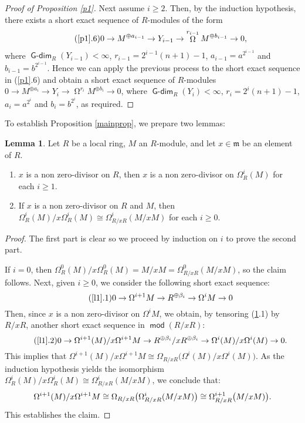 \documentclass{amsart}
\theoremstyle{plain} %
\theoremstyle{definition}
\newtheorem{lem}[thm]{Lemma}
\newcommand{\iso}{\cong}
\newcommand{\m}{\mathfrak{m}}
\def\md{\operatorname{\mathsf{mod}}}
\DeclareMathOperator{\Gdim}{\mathsf{G-dim}}
\DeclareMathOperator{\syz}{\Omega}
\begin{document}
\begin{proof} [Proof of Proposition \ref{p1}]
Next assume $i\geq 2$. Then, by the induction hypothesis, there exists a short exact sequence of $R$-modules of the form
\begin{align} \tag{\ref{p1}.6}
0\to M^{\oplus a_{i-1}} \to Y_{i-1} \to \syz^{r_{i-1}} M^{\oplus b_{i-1}} \to 0,
\end{align}
where $\Gdim_R(Y_{i-1})<\infty$, $r_{i-1}=2^{i-1}(n+1)-1$, $a_{i-1}=a^{2^{i-1}}$ and $b_{i-1}=b^{2^{i-1}}$. Hence we can apply the previous process to the short exact sequence in (\ref{p1}.6) and obtain a short exact sequence of $R$-modules $0\to M^{\oplus a_i} \to Y_i \to \syz^{r_i} M^{\oplus b_i} \to 0$, where $\Gdim_R(Y_i)<\infty$, $r_i=2^i(n+1)-1$, $a_i=a^{2^{i}}$ and $b_i=b^{2^{i}}$, as required.
\end{proof}


To establish Proposition \ref{mainprop}, we prepare two lemmas:

\begin{lem} \label{l1} Let $R$ be a local ring, $M$ an $R$-module, and let $x \in \m$ be an element of $R$.
\begin{enumerate}[\rm(i)]
\item $x$ is a non zero-divisor on $R$, then $x$ is a non zero-divisor on $\Omega_R^i(M)$ for each $i \geq 1$.
\item If $x$ is a non zero-divisor on $R$ and $M$, then $\Omega_R^i(M)/x\Omega_R^i(M) \iso \Omega_{R/xR}^i(M/xM)$ for each $i\geq 0$.
\end{enumerate}
\end{lem}

\begin{proof} The first part is clear so we proceed by induction on $i$ to prove the second part.

If $i=0$, then $\Omega_R^0(M)/x\Omega_R^0(M)=M/xM=\Omega_{R/xR}^0(M/xM)$, so the claim follows. Next, given $i\geq 0$, we consider the following short exact sequence:
\begin{equation}\tag{\ref{l1}.1}
0 \rightarrow \Omega^{i+1} M \rightarrow R^{\oplus \beta_i} \rightarrow \Omega^iM \rightarrow 0
\end{equation}
Then, since $x$ is a non zero-divisor on $\Omega^iM$, we obtain, by tensoring (\ref{l1}.1) by $R/xR$, another short exact sequence in $\md(R/xR)$:
\begin{equation}\tag{\ref{l1}.2}
0 \rightarrow \Omega^{i+1}(M)/x\Omega^{i+1}M  \rightarrow R^{\oplus \beta_i}/xR^{\oplus \beta_i} \rightarrow \Omega^i(M)/x\Omega^i(M) \rightarrow 0.
\end{equation}
This implies that $\Omega^{i+1}(M)/x\Omega^{i+1}M \cong \Omega_{R/xR}\big(\Omega^i(M)/x\Omega^i(M)\big)$. As the induction hypothesis yields the isomorphism $\Omega_R^i(M)/x\Omega_R^i(M) \iso \Omega_{R/xR}^i(M/xM)$, we conclude that: 
\begin{equation}\notag{}
\Omega^{i+1}(M)/x\Omega^{i+1}M \cong \Omega_{R/xR}\big(\Omega_{R/xR}^i(M/xM)\big) \cong \Omega^{i+1}_{R/xR}\big(M/xM)\big). 
\end{equation}
This establishes the claim.
\end{proof}
\end{document}
